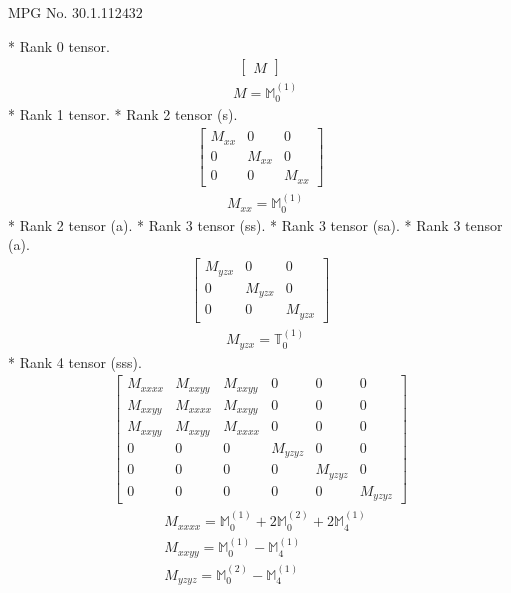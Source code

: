 \documentclass[fleqn,8pt,landscape]{jsarticle}
\begin{document}
\setcounter{MaxMatrixCols}{32}

\renewcommand{\tablename}{Table~}
\renewcommand{\figurename}{Figure~}
\begin{center}
\LARGE
MPG No. 30.1.112\quad$432$
\end{center}
* Rank 0 tensor.
\begin{align*}
\begin{bmatrix} M \end{bmatrix}
\end{align*}
\begin{align*}
& M = \mathbb{M}_{0}^{(1)}
\end{align*}
* Rank 1 tensor.
* Rank 2 tensor (s).
\begin{align*}
\begin{bmatrix} M_{xx} & 0 & 0 \\ 0 & M_{xx} & 0 \\ 0 & 0 & M_{xx} \end{bmatrix}
\end{align*}
\begin{align*}
& M_{xx} = \mathbb{M}_{0}^{(1)}
\end{align*}
* Rank 2 tensor (a).
* Rank 3 tensor (ss).
* Rank 3 tensor (sa).
* Rank 3 tensor (a).
\begin{align*}
\begin{bmatrix} M_{yzx} & 0 & 0 \\ 0 & M_{yzx} & 0 \\ 0 & 0 & M_{yzx} \end{bmatrix}
\end{align*}
\begin{align*}
& M_{yzx} = \mathbb{T}_{0}^{(1)}
\end{align*}
* Rank 4 tensor (sss).
\begin{align*}
\begin{bmatrix} M_{xxxx} & M_{xxyy} & M_{xxyy} & 0 & 0 & 0 \\ M_{xxyy} & M_{xxxx} & M_{xxyy} & 0 & 0 & 0 \\ M_{xxyy} & M_{xxyy} & M_{xxxx} & 0 & 0 & 0 \\ 0 & 0 & 0 & M_{yzyz} & 0 & 0 \\ 0 & 0 & 0 & 0 & M_{yzyz} & 0 \\ 0 & 0 & 0 & 0 & 0 & M_{yzyz} \end{bmatrix}
\end{align*}
\begin{align*}
& M_{xxxx} = \mathbb{M}_{0}^{(1)} + 2 \mathbb{M}_{0}^{(2)} + 2 \mathbb{M}_{4}^{(1)} \\
& M_{xxyy} = \mathbb{M}_{0}^{(1)} - \mathbb{M}_{4}^{(1)} \\
& M_{yzyz} = \mathbb{M}_{0}^{(2)} - \mathbb{M}_{4}^{(1)}
\end{align*}
\end{document}
